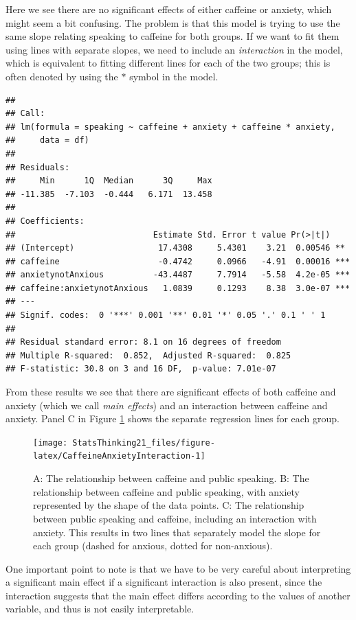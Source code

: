 \documentclass[12pt,]{book}
\theoremstyle{definition}
\theoremstyle{definition}
\theoremstyle{definition}
\theoremstyle{remark}
\begin{document}
Here we see there are no significant effects of either caffeine or anxiety, which might seem a bit confusing. The problem is that this model is trying to use the same slope relating speaking to caffeine for both groups. If we want to fit them using lines with separate slopes, we need to include an \emph{interaction} in the model, which is equivalent to fitting different lines for each of the two groups; this is often denoted by using the \(*\) symbol in the model.

\begin{verbatim}
## 
## Call:
## lm(formula = speaking ~ caffeine + anxiety + caffeine * anxiety, 
##     data = df)
## 
## Residuals:
##     Min      1Q  Median      3Q     Max 
## -11.385  -7.103  -0.444   6.171  13.458 
## 
## Coefficients:
##                            Estimate Std. Error t value Pr(>|t|)    
## (Intercept)                 17.4308     5.4301    3.21  0.00546 ** 
## caffeine                    -0.4742     0.0966   -4.91  0.00016 ***
## anxietynotAnxious          -43.4487     7.7914   -5.58  4.2e-05 ***
## caffeine:anxietynotAnxious   1.0839     0.1293    8.38  3.0e-07 ***
## ---
## Signif. codes:  0 '***' 0.001 '**' 0.01 '*' 0.05 '.' 0.1 ' ' 1
## 
## Residual standard error: 8.1 on 16 degrees of freedom
## Multiple R-squared:  0.852,  Adjusted R-squared:  0.825 
## F-statistic: 30.8 on 3 and 16 DF,  p-value: 7.01e-07
\end{verbatim}

From these results we see that there are significant effects of both caffeine and anxiety (which we call \emph{main effects}) and an interaction between caffeine and anxiety. Panel C in Figure \ref{fig:CaffeineAnxietyInteraction} shows the separate regression lines for each group.

\begin{figure}
\texttt{[image: StatsThinking21\_files/figure-latex/CaffeineAnxietyInteraction-1]} \caption{A: The relationship between caffeine and public speaking. B: The relationship between caffeine and public speaking, with anxiety represented by the shape of the data points. C: The relationship between public speaking and caffeine, including an interaction with anxiety.  This results in two lines that separately model the slope for each group (dashed for anxious, dotted for non-anxious).}\label{fig:CaffeineAnxietyInteraction}
\end{figure}

One important point to note is that we have to be very careful about interpreting a significant main effect if a significant interaction is also present, since the interaction suggests that the main effect differs according to the values of another variable, and thus is not easily interpretable.
\end{document}
